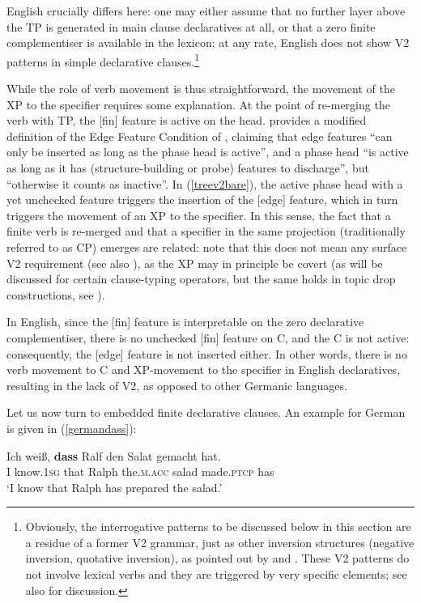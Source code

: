English crucially differs here: one may either assume that no further layer above the TP is generated in main clause declaratives at all, or that a zero finite complementiser is available in the lexicon; at any rate, English does not show V2 patterns in simple declarative clauses.\footnote{Obviously, the interrogative patterns to be discussed below in this section are a residue of a former V2 grammar, just as other inversion structures (negative inversion, quotative inversion), as pointed out by \citet{rizzi1996} and \citet{roberts2010}. These V2 patterns do not involve lexical verbs and they are triggered by very specific elements; see also \citet{sailor2020} for discussion.}  

While the role of verb movement is thus straightforward, the movement of the XP to the specifier requires some explanation. At the point of re-merging the verb with TP, the [fin] feature is active on the head. \citet[171]{mueller2011} provides a modified definition of the Edge Feature Condition of \citet[109]{chomsky2000}, claiming that edge features ``can only be inserted as long as the phase head is active'', and a phase head ``is active as long as it has (structure-building or probe) features to discharge'', but ``otherwise it counts as inactive''. In (\ref{treev2bare}), the active phase head with a yet unchecked feature triggers the insertion of the [edge] feature, which in turn triggers the movement of an XP to the specifier. In this sense, the fact that a finite verb is re-merged and that a specifier in the same projection (traditionally referred to as CP) emerges are related: note that this does not mean any surface V2 requirement (see also \citealt{fanselow2009}), as the XP may in principle be covert (as will be discussed for certain clause-typing operators, but the same holds in topic drop constructions, see \citealt{trutkowski2016}).

In English, since the [fin] feature is interpretable on the zero declarative complementiser, there is no unchecked [fin] feature on C, and the C is not active: consequently, the [edge] feature is not inserted either. In other words, there is no verb movement to C and XP-movement to the specifier in English declaratives, resulting in the lack of V2, as opposed to other Germanic languages.

Let us now turn to embedded finite declarative clauses. An example for German is given in (\ref{germandass}):

\ea \gll Ich weiß, \textbf{dass} Ralf den Salat gemacht hat. \label{germandass}\\
I know.\textsc{1sg} that Ralph the.\textsc{m.acc} salad made.\textsc{ptcp} has\\
\glt `I know that Ralph has prepared the salad.'
\z

